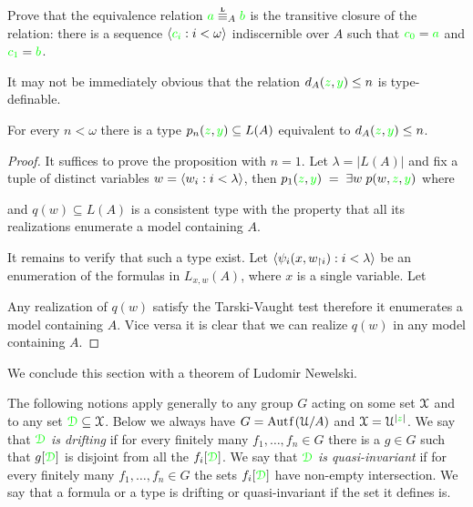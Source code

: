 \documentclass[creche.tex]{subfiles}
\begin{document}
\begin{exercise}
  Prove that the equivalence relation ${\gr a}\stackrel{\smash{\scalebox{.5}{\rm\bf L}}}{\equiv}_A{\gr b}$ is the transitive closure of the relation: there is a sequence $\langle{\color{green}c_i}:i<\omega\rangle$ indiscernible over $A$ such that ${\color{green} c_0}={\color{green} a}$ and ${\color{green} c_1}={\color{green} b}$.\QED
\end{exercise}

It may not be immediately obvious that the relation $d_A({\color{green} z},{\color{green} y})\le n$ is type-definable. 

\begin{proposition}\label{prop_Lascar_distance_type_def}
For every $n<\omega$ there is a type $p_n({\color{green} z},{\color{green} y})\subseteq L(A)$ equivalent to $d_A({\color{green} z},{\color{green} y})\le n$.  
\end{proposition}
\begin{proof}
It suffices to prove the proposition with $n=1$. Let $\lambda=|L(A)|$ and fix a tuple of distinct variables $w=\langle w_i:i<\lambda\rangle$, then $p_1({\color{green} z},{\color{green} y})\;=\;\exists w\;p(w,{\color{green} z},{\color{green} y})$ where


and $q(w)\subseteq L(A)$ is a consistent type with the property that all its realizations enumerate a model containing $A$.

It remains to verify that such a type exist. Let $\langle\psi_i(x,w_{\restriction i}):i<\lambda\rangle$ be an enumeration of the formulas in $L_{x,w}(A)$, where $x$ is a single variable. Let 


Any realization of $q(w)$ satisfy the Tarski-Vaught test therefore it enumerates a model containing $A$. Vice versa it is clear that we can realize $q(w)$ in any model containing $A$.
\end{proof}

We conclude this section with a theorem of Ludomir Newelski. 

The following notions apply generally to any group $G$ acting on some set $\EuScript X$ and to any set ${\color{green}\EuScript D}\subseteq \EuScript X$. Below we always have $G=\mathord{\rm Aut\kern.15ex{f}\kern.15ex}(\EuScript U/A)$ and $\EuScript X=\EuScript U^{|{\color{green} z}|}$.  We say that ${\color{green}\EuScript D}$ \emph{is drifting\/} if for every finitely many $f_1,\dots,f_n\in G$ there is a $g\in G$ such that $g[{\color{green}\EuScript D}]$ is disjoint from all the $f_i[{\color{green}\EuScript D}]$. We say that ${\color{green}\EuScript D}$ \emph{is quasi-invariant\/} if for every finitely many $f_1,\dots,f_n\in G$ the sets  $f_i[{\color{green}\EuScript D}]$ have non-empty intersection. We say that a formula or a type is drifting or quasi-invariant if the set it defines is.
\end{document}
